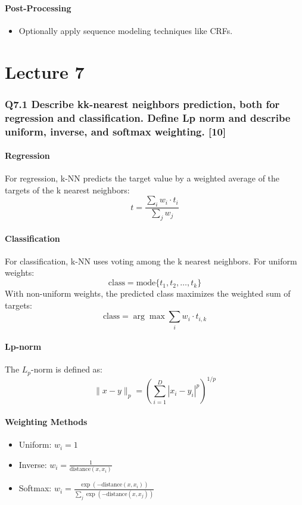 \documentclass[11pt]{article}
\begin{document}
\subsection*{Post-Processing}
\begin{itemize}
    \item Optionally apply sequence modeling techniques like CRFs.
\end{itemize}

\part{Lecture 7}

\section{Q7.1 Describe kk-nearest neighbors prediction, both for regression and classification. Define Lp norm and describe uniform, inverse, and softmax weighting. [10]}

\subsection*{Regression}
For regression, k-NN predicts the target value by a weighted average of the targets of the k nearest neighbors:
\[ t = \frac{\sum_{i} w_i \cdot t_i}{\sum_{j} w_j} \]

\subsection*{Classification}
For classification, k-NN uses voting among the k nearest neighbors. For uniform weights:
\[ \text{class} = \text{mode}\{t_1, t_2, \ldots, t_k\} \]
With non-uniform weights, the predicted class maximizes the weighted sum of targets:
\[ \text{class} = \arg\max \sum_{i} w_i \cdot t_{i,k} \]

\subsection*{Lp-norm}
The \( L_p \)-norm is defined as:
\[ \lVert x - y \rVert_p = \left( \sum_{i=1}^{D} |x_i - y_i|^p \right)^{1/p} \]

\subsection*{Weighting Methods}
\begin{itemize}
    \item Uniform: \( w_i = 1 \)
    \item Inverse: \( w_i = \frac{1}{\text{distance}(x, x_i)} \)
    \item Softmax: \( w_i = \frac{\exp(-\text{distance}(x, x_i))}{\sum_j \exp(-\text{distance}(x, x_j))} \)
\end{itemize}
\end{document}
